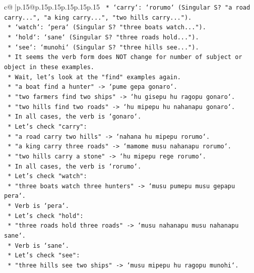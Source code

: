 \documentclass{article}
\begin{document}
{\begin{supertabular}{c@{$\;$}|p{.15\linewidth}@{}p{.15\linewidth}p{.15\linewidth}p{.15\linewidth}p{.15\linewidth}p{.15\linewidth}}
{{{\texttt{        *   `carry`: `rorumo` (Singular S? "a road carry...", "a king carry...", "two hills carry...").} \\
\texttt{        *   `watch`: `pera` (Singular S? "three boats watch...").} \\
\texttt{        *   `hold`: `sane` (Singular S? "three roads hold...").} \\
\texttt{        *   `see`: `munohi` (Singular S? "three hills see...").} \\
\texttt{        *   It seems the verb form does NOT change for number of subject or object in these examples.} \\
\texttt{        *   Wait, let's look at the "find" examples again.} \\
\texttt{            *   "a boat find a hunter" {-}> `pume gepa gonaro`.} \\
\texttt{            *   "two farmers find two ships" {-}> `hu gisepu hu ragopu gonaro`.} \\
\texttt{            *   "two hills find two roads" {-}> `hu mipepu hu nahanapu gonaro`.} \\
\texttt{            *   In all cases, the verb is `gonaro`.} \\
\texttt{        *   Let's check "carry":} \\
\texttt{            *   "a road carry two hills" {-}> `nahana hu mipepu rorumo`.} \\
\texttt{            *   "a king carry three roads" {-}> `mamome musu nahanapu rorumo`.} \\
\texttt{            *   "two hills carry a stone" {-}> `hu mipepu rege rorumo`.} \\
\texttt{            *   In all cases, the verb is `rorumo`.} \\
\texttt{        *   Let's check "watch":} \\
\texttt{            *   "three boats watch three hunters" {-}> `musu pumepu musu gepapu pera`.} \\
\texttt{            *   Verb is `pera`.} \\
\texttt{        *   Let's check "hold":} \\
\texttt{            *   "three roads hold three roads" {-}> `musu nahanapu musu nahanapu sane`.} \\
\texttt{            *   Verb is `sane`.} \\
\texttt{        *   Let's check "see":} \\
\texttt{            *   "three hills see two ships" {-}> `musu mipepu hu ragopu munohi`.} \\
}}}
\end{supertabular}}
\end{document}
